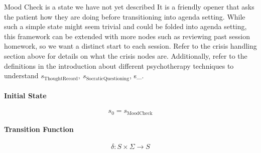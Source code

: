 \documentclass[twoside]{report}
\begin{document}
Mood Check is a state we have not yet described It is a friendly opener that asks the patient how they are doing before transitioning into agenda setting. While such a simple state might seem trivial and could be folded into agenda setting, this framework can be extended with more nodes such as reviewing past session homework, so we want a distinct start to each session. Refer to the crisis handling section above for details on what the crisis nodes are. Additionally, refer to the definitions in the introduction about different psychotherapy techniques to understand $s_{\text{ThoughtRecord}},\ s_{\text{SocraticQuestioning}}$,
s_{}.


\paragraph{Initial State}
\[
s_0 = s_{\text{MoodCheck}}
\]

\paragraph{Transition Function}
\[
\delta : S \times \Sigma \rightarrow S
\]
\end{document}
